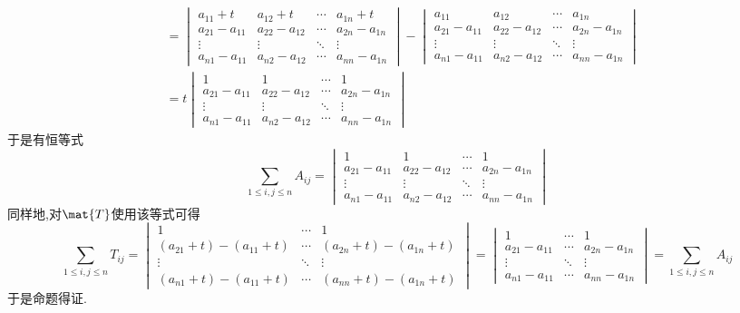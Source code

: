 \documentclass{ctexart}
\begin{document}
\begin{solution}
\[\begin{aligned}
        &= \begin{vmatrix}
                a_{11}+t&a_{12}+t&\cdots&a_{1n}+t\\
                a_{21}-a_{11}&a_{22}-a_{12}&\cdots&a_{2n}-a_{1n}\\
                \vdots&\vdots&\ddots&\vdots\\
                a_{n1}-a_{11}&a_{n2}-a_{12}&\cdots&a_{nn}-a_{1n}
            \end{vmatrix}-
            \begin{vmatrix}
                a_{11}&a_{12}&\cdots&a_{1n}\\
                a_{21}-a_{11}&a_{22}-a_{12}&\cdots&a_{2n}-a_{1n}\\
                \vdots&\vdots&\ddots&\vdots\\
                a_{n1}-a_{11}&a_{n2}-a_{12}&\cdots&a_{nn}-a_{1n}
            \end{vmatrix}\\
            &= t\begin{vmatrix}
                1&1&\cdots&1\\
                a_{21}-a_{11}&a_{22}-a_{12}&\cdots&a_{2n}-a_{1n}\\
                \vdots&\vdots&\ddots&\vdots\\
                a_{n1}-a_{11}&a_{n2}-a_{12}&\cdots&a_{nn}-a_{1n}
            \end{vmatrix}
    \end{aligned}\]
    于是有恒等式
    \[\sum_{1\leqslant i,j\leqslant n}A_{ij}=\begin{vmatrix}
        1&1&\cdots&1\\
        a_{21}-a_{11}&a_{22}-a_{12}&\cdots&a_{2n}-a_{1n}\\
        \vdots&\vdots&\ddots&\vdots\\
        a_{n1}-a_{11}&a_{n2}-a_{12}&\cdots&a_{nn}-a_{1n}
    \end{vmatrix}\]
    同样地,对$\mat{T}$使用该等式可得
    \[\sum_{1\leqslant i,j\leqslant n}T_{ij}=\begin{vmatrix}
        1&\cdots&1\\
        \left(a_{21}+t\right)-\left(a_{11}+t\right)&\cdots&\left(a_{2n}+t\right)-\left(a_{1n}+t\right)\\
        \vdots&\ddots&\vdots\\
        \left(a_{n1}+t\right)-\left(a_{11}+t\right)&\cdots&\left(a_{nn}+t\right)-\left(a_{1n}+t\right)
    \end{vmatrix}=\begin{vmatrix}
        1&\cdots&1\\
        a_{21}-a_{11}&\cdots&a_{2n}-a_{1n}\\
        \vdots&\ddots&\vdots\\
        a_{n1}-a_{11}&\cdots&a_{nn}-a_{1n}
    \end{vmatrix}=\sum_{1\leqslant i,j\leqslant n}A_{ij}\]
    于是命题得证.
\end{solution}
\end{document}
